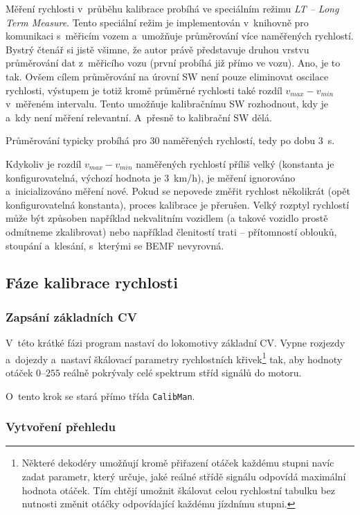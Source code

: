 Měření rychlosti v~průběhu kalibrace probíhá ve speciálním režimu \textit{\gls{LT} --
Long Term Measure}. Tento speciální režim je implementován v~knihov\-ně pro komunikaci
s~měřicím vozem a~umožňuje průměrování více naměřených rychlostí. Bystrý čtenář si
jistě všimne, že autor právě představuje druhou vrstvu průměrování dat
z~měřicího vozu (první probíhá již přímo ve vozu). Ano, je to tak. Ovšem cílem
průměrování na úrovní SW není pouze eliminovat oscilace rychlosti, výstupem
je totiž kromě průměrné rychlosti také rozdíl $v_{max} - v_{min}$ v~měřeném
intervalu. Tento  umožňuje kalibračnímu SW rozhodnout, kdy
je a~kdy není měření relevantní. A~přesně to kalibrační SW dělá.

Průměrování typicky probíhá pro $30$ naměřených rychlostí, tedy po dobu $3$~s.

Kdykoliv je rozdíl $v_{max} - v_{min}$ naměřených rychlostí příliš velký
(konstanta je konfigurovatelná, výchozí hodnota je $3$~km/h), je
měření ignorováno a~inicializováno měření nové. Pokud se nepovede změřit
rychlost několikrát (opět konfigurovatelná konstanta), proces kalibrace je
přerušen. Velký rozptyl rychlostí může být způsoben například nekvalitním
vozidlem (a takové vozidlo prostě odmítneme zkalibrovat) nebo například
členitostí trati -- přítomností oblouků, stoupání a~klesání, s~kterými se \gls{BEMF}
nevyrovná.

\subsection{Fáze kalibrace rychlosti}

\subsubsection{Zapsání základních \gls{CV}}

V~této krátké fázi program nastaví do lokomotivy základní \gls{CV}. Vypne rozjezdy
a~dojezdy a~nastaví škálovací parametry rychlostních křivek\footnote{Některé
dekodéry umožňují kromě přiřazení otáček každému stupni navíc zadat parametr,
který určuje, jaké reálné střídě signálu odpovídá maximální hodnota otáček.
Tím chtějí umožnit škálovat celou rychlostní tabulku bez nutnosti změnit otáčky
odpovídající každému jízdnímu stupni.} tak, aby hodnoty otáček $0$--$255$
reálně pokrývaly celé spektrum stříd signálů do motoru.

O~tento krok se stará přímo třída \texttt{CalibMan}.

\subsubsection{Vytvoření přehledu}

